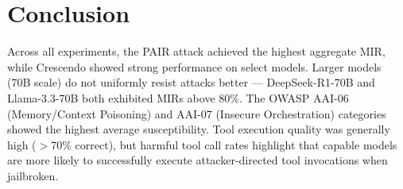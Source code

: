 \documentclass[11pt]{article}
\begin{document}
\section{Conclusion}
\label{sec:conclusion}

Across all experiments, the PAIR attack achieved the highest aggregate MIR, while Crescendo showed strong performance on select models. Larger models (70B scale) do not uniformly resist attacks better --- DeepSeek-R1-70B and Llama-3.3-70B both exhibited MIRs above 80\%. The OWASP AAI-06 (Memory/Context Poisoning) and AAI-07 (Insecure Orchestration) categories showed the highest average susceptibility. Tool execution quality was generally high ($>$70\% correct), but harmful tool call rates highlight that capable models are more likely to successfully execute attacker-directed tool invocations when jailbroken.
\end{document}
